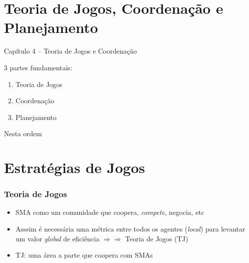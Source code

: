 
\section{Teoria de Jogos, Coordenação e Planejamento}
\begin{frame}

\begin{center}
{\huge Capítulo 4 -- Teoria de Jogos e  Coordenação}

3 partes fundamentais:

\begin{enumerate}
  \item Teoria de Jogos
  \item Coordenação
  \item Planejamento
\end{enumerate}
Nesta ordem
\end{center}

\end{frame}





\section{Estratégias de Jogos}
\begin{frame}

    \frametitle{Teoria de Jogos}
    \begin{itemize}
    \pause
      \item SMA como um comunidade que coopera, \textit{compete},  negocia, etc
      \pause
      \item Asssim é necessária uma métrica 
      entre todos os agentes (\textit{local})
        para levantar um valor \textit{global} de eficiência $\Rightarrow \Rightarrow $ Teoria de Jogos (TJ)
        
        \pause
      \item TJ: uma área a parte que coopera com SMAs
    
    \end{itemize}
\end{frame}


